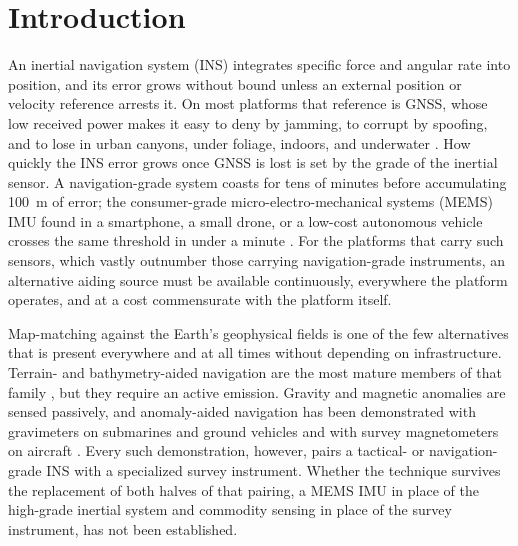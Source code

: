 \section{Introduction}
\label{sec:introduction}

An inertial navigation system (INS) integrates specific force and angular rate into position, and its error grows without bound unless an external position or velocity reference arrests it. On most platforms that reference is GNSS, whose low received power makes it easy to deny by jamming, to corrupt by spoofing, and to lose in urban canyons, under foliage, indoors, and underwater \citep{humphreys2008, divis2013gps}. How quickly the INS error grows once GNSS is lost is set by the grade of the inertial sensor. A navigation-grade system coasts for tens of minutes before accumulating 100~m of error; the consumer-grade micro-electro-mechanical systems (MEMS) IMU found in a smartphone, a small drone, or a low-cost autonomous vehicle crosses the same threshold in under a minute \citep{groves_ch14}. For the platforms that carry such sensors, which vastly outnumber those carrying navigation-grade instruments, an alternative aiding source must be available continuously, everywhere the platform operates, and at a cost commensurate with the platform itself.

Map-matching against the Earth's geophysical fields is one of the few alternatives that is present everywhere and at all times without depending on infrastructure. Terrain- and bathymetry-aided navigation are the most mature members of that family \citep{baker1977terrain, williams2001towards_tan, donovan2012}, but they require an active emission. Gravity and magnetic anomalies are sensed passively, and anomaly-aided navigation has been demonstrated with gravimeters on submarines and ground vehicles \citep{jircitano1991gravity, kamgar1999vehicle} and with survey magnetometers on aircraft \citep{canciani2016absolute, canciani2017airborne}. Every such demonstration, however, pairs a tactical- or navigation-grade INS with a specialized survey instrument. Whether the technique survives the replacement of both halves of that pairing, a MEMS IMU in place of the high-grade inertial system and commodity sensing in place of the survey instrument, has not been established.

